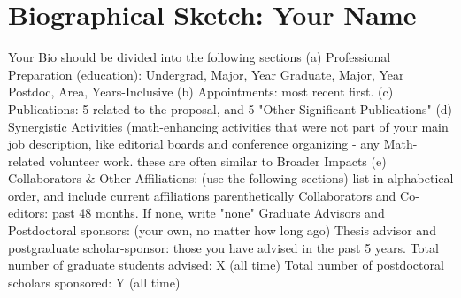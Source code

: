 
\section{Biographical Sketch: Your Name}

Your Bio should be divided into the following sections
(a) Professional Preparation (education):
Undergrad, Major, Year
Graduate, Major, Year
Postdoc, Area, Years-Inclusive
(b) Appointments:  most recent first.
(c) Publications:  5 related to the proposal, and 5 "Other Significant Publications"
(d) Synergistic Activities (math-enhancing activities that were not
part of your main job description, like editorial boards and
conference organizing - any Math-related volunteer work.
these are often similar to Broader Impacts
(e) Collaborators & Other Affiliations: (use the following sections)
list in alphabetical order, and include current affiliations parenthetically
Collaborators and Co-editors: past 48 months.  If none, write "none"
Graduate Advisors and Postdoctoral sponsors: (your own, no matter how long ago)
Thesis advisor and postgraduate scholar-sponsor:  those you have advised
in the past 5 years.  
Total number of graduate students advised: X (all time)
Total number of postdoctoral scholars sponsored: Y (all time)